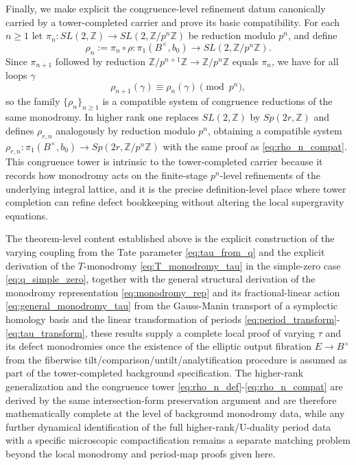 \documentclass[11pt]{article}
\theoremstyle{remark}
\begin{document}
Finally, we make explicit the congruence-level refinement datum canonically carried by a tower-completed carrier and prove its basic compatibility. For each $n\ge 1$ let $\pi_n:SL(2,\mathbb{Z})\to SL(2,\mathbb{Z}/p^n\mathbb{Z})$ be reduction modulo $p^n$, and define
\begin{equation}\label{eq:rho_n_def}
\rho_n:=\pi_n\circ\rho:\pi_1(B^\times,b_0)\longrightarrow SL(2,\mathbb{Z}/p^n\mathbb{Z}).
\end{equation}
Since $\pi_{n+1}$ followed by reduction $\mathbb{Z}/p^{n+1}\mathbb{Z}\to\mathbb{Z}/p^n\mathbb{Z}$ equals $\pi_n$, we have for all loops $\gamma$
\begin{equation}\label{eq:rho_n_compat}
\rho_{n+1}(\gamma)\equiv \rho_n(\gamma)\pmod{p^n},
\end{equation}
so the family $\{\rho_n\}_{n\ge 1}$ is a compatible system of congruence reductions of the same monodromy. In higher rank one replaces $SL(2,\mathbb{Z})$ by $Sp(2r,\mathbb{Z})$ and defines $\rho_{r,n}$ analogously by reduction modulo $p^n$, obtaining a compatible system $\rho_{r,n}:\pi_1(B^\times,b_0)\to Sp(2r,\mathbb{Z}/p^n\mathbb{Z})$ with the same proof as \eqref{eq:rho_n_compat}. This congruence tower is intrinsic to the tower-completed carrier because it records how monodromy acts on the finite-stage $p^n$-level refinements of the underlying integral lattice, and it is the precise definition-level place where tower completion can refine defect bookkeeping without altering the local supergravity equations.

The theorem-level content established above is the explicit construction of the varying coupling from the Tate parameter \eqref{eq:tau_from_q} and the explicit derivation of the $T$-monodromy \eqref{eq:T_monodromy_tau} in the simple-zero case \eqref{eq:q_simple_zero}, together with the general structural derivation of the monodromy representation \eqref{eq:monodromy_rep} and its fractional-linear action \eqref{eq:general_monodromy_tau} from the Gauss-Manin transport of a symplectic homology basis and the linear transformation of periods \eqref{eq:period_transform}-\eqref{eq:tau_transform}, these results supply a complete local proof of varying $\tau$ and its defect monodromies once the existence of the elliptic output fibration $E\to B^\times$ from the fiberwise tilt/comparison/untilt/analytification procedure is assumed as part of the tower-completed background specification. The higher-rank generalization and the congruence tower \eqref{eq:rho_n_def}-\eqref{eq:rho_n_compat} are derived by the same intersection-form preservation argument and are therefore mathematically complete at the level of background monodromy data, while any further dynamical identification of the full higher-rank/U-duality period data with a specific microscopic compactification remains a separate matching problem beyond the local monodromy and period-map proofs given here.
\end{document}
